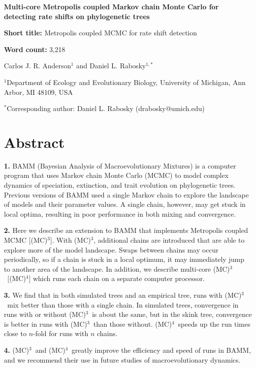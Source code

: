 \documentclass[12pt]{article}
\newcommand{\MCMCMC}{(MC)$^{3}$}
\newcommand{\MCMCMCMC}{(MC)$^{4}$}
\begin{document}
\baselineskip 24pt

\begin{flushleft}

{\Large\textbf{Multi-core Metropolis coupled Markov chain Monte Carlo
    for detecting rate shifts on phylogenetic trees}}

\textbf{Short title:} Metropolis coupled MCMC for rate shift detection

\textbf{Word count:} 3,218

Carlos J. R. Anderson$^{1}$ and
Daniel L. Rabosky$^{1,*}$

$^{1}$Department of Ecology and Evolutionary Biology,
    University of Michigan, Ann Arbor, MI 48109, USA

$^{*}$Corresponding author: Daniel L. Rabosky (drabosky@umich.edu)

\end{flushleft}


\pagebreak[4]


\section*{Abstract}

{\setlength{\parindent}{0cm}

\textbf{1.}
BAMM (Bayesian Analysis of Macroevolutionary Mixtures) is a computer program
that uses Markov chain Monte Carlo (MCMC) to model complex dynamics
of speciation, extinction, and trait evolution on phylogenetic trees.
%
Previous versions of BAMM used a single Markov chain
to explore the landscape of models and their parameter values.
%
A single chain, however, may get stuck in local optima,
resulting in poor performance in both mixing and convergence.

\textbf{2.}
Here we describe an extension to BAMM
that implements Metropolis coupled MCMC [\MCMCMC].
%
With \MCMCMC, additional chains are introduced
that are able to explore more of the model landscape.
%
Swaps between chains may occur periodically,
so if a chain is stuck in a local optimum,
it may immediately jump to another area of the landscape.
%
In addition, we describe multi-core \MCMCMC\ [\MCMCMCMC]
which runs each chain on a separate computer processor.

\textbf{3.}
We find that in both simulated trees and an empirical tree,
runs with \MCMCMC\ mix better than those with a single chain.
%
In simulated trees, convergence in runs with or without \MCMCMC\ 
is about the same, but in the skink tree,
convergence is better in runs with \MCMCMC\ than those without.
%
\MCMCMCMC\ speeds up the run times close to $n$-fold
for runs with $n$ chains.

\textbf{4.}
\MCMCMC\ and \MCMCMCMC\ greatly improve
the efficiency and speed of runs in BAMM,
and we recommend their use in future studies of macroevolutionary dynamics.
}
\end{document}
